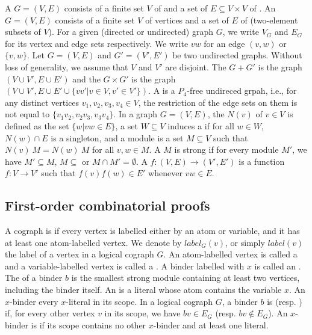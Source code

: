 \documentclass[conference,twosided,10pt]{IEEEtran}
\theoremstyle{definition}
\begin{document}
A  $G = (V, E)$ consists of a finite set $V$ of
 and a set of $E \subseteq V \times V$ of . An
 $G = (V, E)$ consists of a finite set $V$ of vertices
and a set of $E$ of  (two-element subsets of $V$).
For a given (directed or undirected) graph $G$, we write $V_G$ and $E_G$ for its
vertex and edge sets respectively. We write $vw$ for an edge $(v, w)$ or $\{v,
w\}$. Let $G = (V, E)$ and $G' = (V', E')$ be two undirected graphs. Without
loss of generality, we assume that $V$ and $V'$ are disjoint. The 
$G + G'$ is the graph $(V \cup V', E \cup E')$ and the  $G \times G'$
is the graph $(V \cup V', E \cup E' \cup \{vv' | v \in V, v' \in V'\})$. A
 is a $P_4$-free undireced grpah, i.e., for any distinct vertices $v_1,
v_2, v_3, v_4 \in V$, the restriction of the edge sets on them is not equal to
$\{v_1v_2, v_2v_3, v_3v_4\}$. In a graph $G = (V, E)$, the 
$N(v)$ of $v \in V$ is defined as the set $\{w | vw \in E\}$, a set $W \subseteq
V$ induces a  if for all $w \in W$, $N(w) \cap E$ is a singleton, and a module is a
set $M \subseteq V$ such that $N(v) \ M = N(w) \ M$ for all $v, w \in M$. A
 $M$ is strong if for every module $M'$, we have $M' \subseteq M$, $M
\subseteq$ or $M \cap M' = \emptyset$. A  $f: (V, E)
\rightarrow (V', E')$ is a function $f : V \rightarrow V'$ such that $f(v)f(w)
\in E'$ whenever $vw \in E$.

\subsection{First-order combinatorial proofs}
A cograph is  if every vertex is labelled either by an atom or variable,
and it has at least one atom-labelled vertex. We denote by $label_G(v)$, or simply
$label(v)$ the label of a vertex in a logical cograph $G$. An atom-labelled vertex is called
a  and a variable-labelled vertex is called a . A
binder labelled with $x$ is called an . The  of a binder
$b$ is the smallest strong module containing at least two vertices, including
the binder itself. An  is a literal whose atom contains the variable $x$. An $x$-binder  every $x$-literal in its scope.
In a logical cograph $G$, a binder $b$ is  (resp. ) if, for every other
vertex $v$ in its scope, we have $bv \in E_G$ (resp. $bv \notin E_G$). An
$x$-binder is  if its scope contains no other $x$-binder and at least one
literal. 
\end{document}
